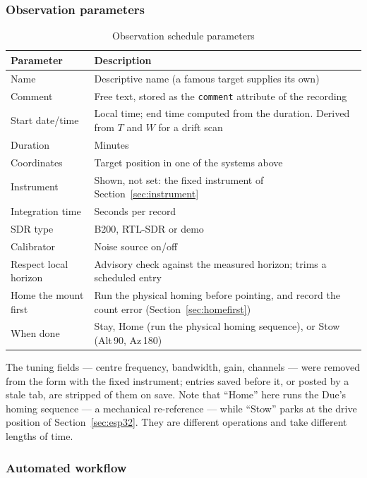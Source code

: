 \documentclass[11pt,a4paper]{article}
\begin{document}
\subsubsection{Observation parameters}

\begin{table}[H]
\centering
\caption{Observation schedule parameters}
\begin{tabular}{ll}
\toprule
\textbf{Parameter} & \textbf{Description} \\
\midrule
Name & Descriptive name (a famous target supplies its own) \\
Comment & Free text, stored as the \texttt{comment} attribute of the recording \\
Start date/time & Local time; end time computed from the duration. Derived from $T$ and $W$ for a drift scan \\
Duration & Minutes \\
Coordinates & Target position in one of the systems above \\
Instrument & Shown, not set: the fixed instrument of Section~\ref{sec:instrument} \\
Integration time & Seconds per record \\
SDR type & B200, RTL-SDR or demo \\
Calibrator & Noise source on/off \\
Respect local horizon & Advisory check against the measured horizon; trims a scheduled entry \\
Home the mount first & Run the physical homing before pointing, and record the count error (Section~\ref{sec:homefirst}) \\
When done & Stay, Home (run the physical homing sequence), or Stow (Alt\,90, Az\,180) \\
\bottomrule
\end{tabular}
\end{table}

The tuning fields --- centre frequency, bandwidth, gain, channels --- were removed from the form with the fixed instrument; entries saved before it, or posted by a stale tab, are stripped of them on save. Note that ``Home'' here runs the Due's homing sequence --- a mechanical re-reference --- while ``Stow'' parks at the drive position of Section~\ref{sec:esp32}. They are different operations and take different lengths of time.

\subsubsection{Automated workflow}
\end{document}
